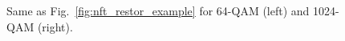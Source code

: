 \begin{landscape}
\begin{figure}[htpb]
\begin{minipage}[h]{0.49\linewidth}
{    }
    \end{minipage}
    \caption{Same as Fig.~\ref{fig:nft_restor_example} for 64-QAM (left) and 1024-QAM (right).}
    \label{fig:nft_compare_modulation}
\end{figure}
\end{landscape}

\begin{landscape}
    \begin{figure}[htpb]
    \begin{minipage}[h]{0.5\linewidth}
    \end{minipage}
    \hfill
    \begin{minipage}[h]{0.5\linewidth}
    \center{
}
\end{minipage}
\end{figure}
\end{landscape}
